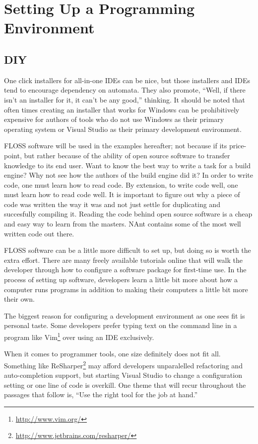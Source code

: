 
\chapter{Setting Up a Programming Environment}

\section{DIY}
One click installers for all-in-one \glspl{IDE} can be nice, but those installers and \glspl{IDE} tend to encourage dependency on automata. They also promote, ``Well, if there 
isn't an installer for it, it can't be any good,'' thinking. It should be noted that often times creating an installer that works for Windows can be prohibitively expensive for authors of tools who do not use Windows as their primary operating system or Visual Studio as their primary development environment.

\gls{FLOSS} software will be used in the examples hereafter; not because if its price-point, but rather because of the ability of open source software
to transfer knowledge to its end user. Want to know the best way to write a task for a build engine? Why not see how the authors of the build
engine did it? In order to write code, one must learn how to read code. By extension, to write code well, one must learn how to read code well. It is 
important to figure out why a piece of code was written the way it was and not just settle for duplicating and succesfully compiling it. Reading the 
code behind open source software is a cheap and easy way to learn from the masters. \gls{NAnt} contains some of the most well written \CSharp code out there.

\gls{FLOSS} software can be a little more difficult to set up, but doing so is worth the extra effort. There are many freely available tutorials
online that will walk the developer through how to configure a software package for first-time use. In the process of setting up software, developers learn a
little bit more about how a computer runs programs in addition to making their computers a little bit more their own.

The biggest reason for configuring a development environment as one sees fit is personal taste. Some developers prefer typing text on the command line in a program like 
Vim\footnote{\url{http://www.vim.org/}} over using an \gls{IDE} exclusively.

When it comes to programmer tools, one size definitely does not fit all. Something like ReSharper\footnote{\url{http://www.jetbrains.com/resharper/}} 
may afford developers unparalelled \gls{refactoring} and \gls{auto-completion} support, but starting Visual Studio to change a configuration setting or one 
line of code is overkill. One theme that will recur throughout the passages that follow is, 
``Use the right tool for the job at hand.''

